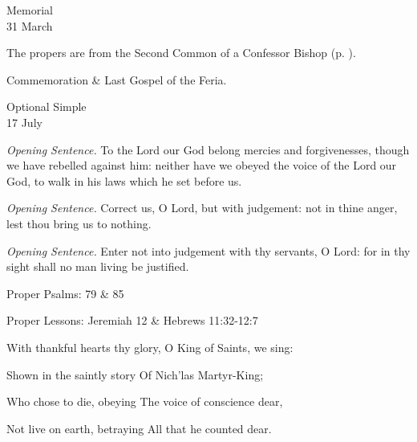 \begin{inhead}
    {Memorial\\
31 March}
\end{inhead}

\begin{rubric}
	The propers are from the Second Common of a Confessor Bishop (p. \pageref{CommonConfessorBishopII}).
\end{rubric}
\begin{rubric}
	Commemoration \& Last Gospel of the Feria.
\end{rubric}







\begin{inhead}
    {Optional Simple\\
17 July}
\end{inhead}

\textit{Opening Sentence.} To the Lord our God belong mercies and forgivenesses, though we have rebelled against him: neither have we obeyed the voice of the Lord our God, to walk in his laws which he set before us.

\textit{Opening Sentence.} Correct us, O Lord, but with judgement: not in thine anger, lest thou bring us to nothing.

\textit{Opening Sentence.} Enter not into judgement with thy servants, O Lord: for in thy sight shall no man living be justified.


\begin{rubric}
	Proper Psalms: 79 \& 85
\end{rubric}
\begin{rubric}
	Proper Lessons: Jeremiah 12 \& Hebrews 11:32-12:7
\end{rubric}

With thankful hearts thy glory, O King of Saints, we sing:

Shown in the saintly story Of Nich'las Martyr-King;

Who chose to die, obeying The voice of conscience dear,

Not live on earth, betraying All that he counted dear.\\

